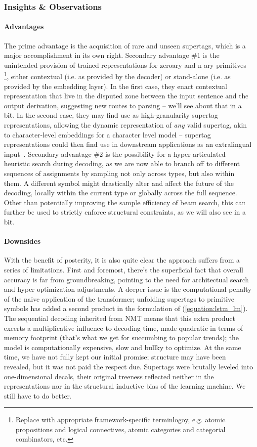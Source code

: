 \subsubsection{Insights \& Observations}
\paragraph{Advantages}
The prime advantage is the acquisition of rare and unseen supertags, which is a major accomplishment in its own right.
Secondary advantage \#1 is the unintended provision of trained representations for zeroary and n-ary primitives%
	\footnote{Replace with appropriate framework-specific terminlogoy, e.g. atomic propositions and logical connectives, atomic categories and categorial combinators, etc.},
either contextual (i.e. as provided by the decoder) or stand-alone (i.e. as provided by the embedding layer).
In the first case, they enact contextual representation that live in the disputed zone between the input sentence and the output derivation, suggesting new routes to parsing -- we'll see about that in a bit.
In the second case, they may find use as high-granularity supertag representations, allowing the dynamic representation of \textit{any} valid supertag, akin to character-level embeddings for a character level model -- supertag representations could then find use in downstream applications as an extralingual input~\cite{kasai-etal-2017-tag}.
Secondary advantage \#2 is the possibility for a hyper-articulated heuristic search during decoding, as we are now able to branch off to different sequences of assignments by sampling not only across types, but also within them.
A different symbol might drastically alter and affect the future of the decoding, locally within the current type or globally across the full sequence.
Other than potentially improving the sample efficiency of beam search, this can further be used to strictly enforce structural constraints, as we will also see in a bit.

\paragraph{Downsides}
With the benefit of posterity, it is also quite clear the approach suffers from a series of limitations.
First and foremost, there's the superficial fact that overall accuracy is far from groundbreaking, pointing to the need for architectual search and hyper-optimization adjustments.
A deeper issue is the computational penalty of the naive application of the transformer; unfolding supertags to primitive symbols has added a second product in the formulation of (\ref{equation:lstm_lm}).
The sequential decoding inherited from NMT means that this extra product excerts a multiplicative influence to decoding time, made quadratic in terms of memory footprint (that's what we get for succumbing to popular trends); the model is computationally expensive, slow and bullky to optimize.
At the same time, we have not fully kept our initial promise; structure may have been revealed, but it was not paid the respect due.
Supertags were brutally leveled into one-dimensional decals, their original treeness reflected neither in the representations nor in the structural inductive bias of the learning machine.
We still have to do better.

